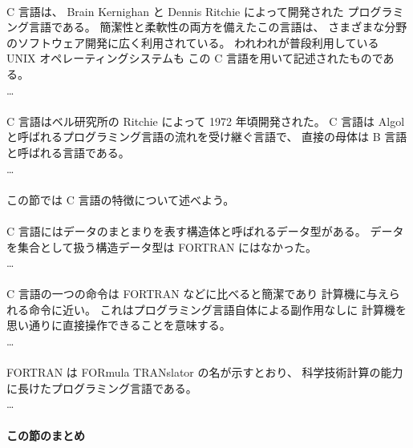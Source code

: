 \begin{kekka}
 \\[.2em]
  
C 言語は、
Brain Kernighan と Dennis Ritchie によって開発された
プログラミング言語である。
簡潔性と柔軟性の両方を備えたこの言語は、
さまざまな分野のソフトウェア開発に広く利用されている。
われわれが普段利用している UNIX オペレーティングシステムも
この C 言語を用いて記述されたものである。\\
\dots \\[.2em]

 \\[.2em]

C 言語はベル研究所の Ritchie によって 1972 年頃開発された。
C 言語は Algol と呼ばれるプログラミング言語の流れを受け継ぐ言語で、
直接の母体は B 言語と呼ばれる言語である。\\
\dots \\[.2em]

 \\[.2em]

この節では C 言語の特徴について述べよう。 \\[.2em]

 \\[.2em]

C 言語にはデータのまとまりを表す構造体と呼ばれるデータ型がある。
データを集合として扱う構造データ型は FORTRAN にはなかった。\\
\dots \\[.2em]

 \\[.2em]

C 言語の一つの命令は FORTRAN などに比べると簡潔であり
計算機に与えられる命令に近い。
これはプログラミング言語自体による副作用なしに
計算機を思い通りに直接操作できることを意味する。\\
\dots \\[.2em]

 \\[.2em]

FORTRAN は FORmula TRANslator の名が示すとおり、
科学技術計算の能力に長けたプログラミング言語である。\\
\dots
\end{kekka}

\paragraph{この節のまとめ}

